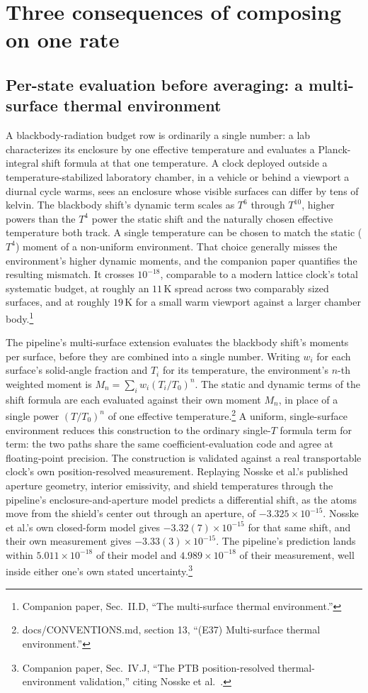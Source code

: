 \documentclass[aps,pra,superscriptaddress,groupedaddress,nofootinbib]{revtex4-2}
\begin{document}
\section{Three consequences of composing on one rate}
\label{sec:payoff}

\subsection{Per-state evaluation before averaging: a multi-surface thermal environment}
\label{sec:bbr}

A blackbody-radiation budget row is ordinarily a single number: a
lab characterizes its enclosure by one effective temperature and
evaluates a Planck-integral shift formula at that one temperature. A
clock deployed outside a temperature-stabilized laboratory chamber,
in a vehicle or behind a viewport a diurnal cycle warms, sees an
enclosure whose visible surfaces can differ by tens of kelvin. The
blackbody shift's dynamic term scales as $T^6$ through $T^{10}$,
higher powers than the $T^4$ power the static shift and the
naturally chosen effective temperature both track. A single
temperature can be chosen to match the static ($T^4$) moment of a
non-uniform environment. That choice generally misses the
environment's higher dynamic moments, and the companion paper
quantifies the resulting mismatch. It crosses $10^{-18}$,
comparable to a modern lattice clock's total systematic budget, at
roughly an $11\,$K spread across two comparably sized surfaces, and
at roughly $19\,$K for a small warm viewport against a larger chamber
body.\footnote{Companion paper, Sec.~II.D, ``The multi-surface
thermal environment.''}

The pipeline's multi-surface extension evaluates
the blackbody shift's moments per surface, before they are combined
into a single number.
Writing $w_i$ for each surface's solid-angle fraction and $T_i$ for
its temperature, the environment's $n$-th weighted moment is
$M_n = \sum_i w_i (T_i/T_0)^n$. The static and dynamic terms of
the shift formula are each evaluated against their own moment $M_n$,
in place of a single power $(T/T_0)^n$ of one effective
temperature.\footnote{docs/CONVENTIONS.md, section 13, ``(E37)
Multi-surface thermal environment.''} A uniform, single-surface
environment reduces this construction to the ordinary single-$T$
formula term for term: the two paths share the same
coefficient-evaluation code and agree at floating-point precision.
The construction is validated
against a real transportable clock's own position-resolved
measurement. Replaying Nosske et al.'s published aperture geometry,
interior emissivity, and shield temperatures through the pipeline's
enclosure-and-aperture model predicts a differential shift, as the
atoms move from the shield's center out through an aperture, of
$-3.325\times10^{-15}$. Nosske et al.'s own closed-form model gives
$-3.32(7)\times10^{-15}$ for that same shift, and their own
measurement gives $-3.33(3)\times10^{-15}$. The pipeline's prediction
lands within $5.011\times10^{-18}$ of
their model and $4.989\times10^{-18}$ of their measurement, well
inside either one's own stated uncertainty.\footnote{Companion paper,
Sec.~IV.J, ``The PTB position-resolved thermal-environment
validation,'' citing Nosske et al.~\cite{Nosske2025}.}
\end{document}
